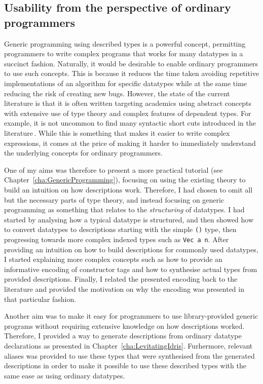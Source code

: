 \documentclass{ituthesis}
\newcommand{\tttype}[1]{\textcolor{type-color}{\texttt{#1}}}
\newcommand{\ttvar}[1]{\textcolor{local-var-color}{\texttt{#1}}}
\theoremstyle{break}
\begin{document}
\subsection{Usability from the perspective of ordinary programmers}
\label{sub:Usabilityfromtheperspectiveofordinaryprogrammers}
Generic programming using described types is a powerful concept, permitting programmers to write complex programs that works for many datatypes in a succinct fashion.
Naturally, it would be desirable to enable ordinary programmers to use such concepts.
This is because it reduces the time taken avoiding repetitive implementations of an algorithm for specific datatypes while at the same time reducing the risk of creating new bugs.
However, the state of the current literature is that it is often written targeting academics using abstract concepts with extensive use of type theory and complex features of dependent types.
For example, it is not uncommon to find many syntactic short cuts introduced in the literature\,\autocite{Chapman:2010:GAL:1863543.1863547,mcbride2010ornamental}.
While this is something that makes it easier to write complex expressions, it comes at the price of making it harder to immediately understand the underlying concepts for ordinary programmers.

One of my aims was therefore to present a more practical tutorial (see Chapter~\ref{cha:GenericProgramming}), focusing on using the existing theory to build an intuition on how descriptions work.
Therefore, I had chosen to omit all but the necessary parts of type theory, and instead focusing on generic programming as something that relates to the \textit{structuring} of datatypes.
I had started by analysing how a typical datatype is structured, and then showed how to convert datatypes to descriptions starting with the simple \tttype{()} type, then progressing towards more complex indexed types such as \tttype{Vec}~\ttvar{a}~\ttvar{n}.
After providing an intuition on how to build descriptions for commonly used datatypes, I started explaining more complex concepts such as how to provide an informative encoding of constructor tags and how to synthesise actual types from provided descriptions.
Finally, I related the presented encoding back to the literature and provided the motivation on why the encoding was presented in that particular fashion.

Another aim was to make it easy for programmers to use library-provided generic programs without requiring extensive knowledge on how descriptions worked.
Therefore, I provided a way to generate descriptions from ordinary datatype declarations as presented in Chapter~\ref{cha:LevitatingIdris}.
Furhermore, relevant aliases was provided to use these types that were synthesised from the generated descriptions in order to make it possible to use these described types with the same ease as using ordinary datatypes.
\end{document}
